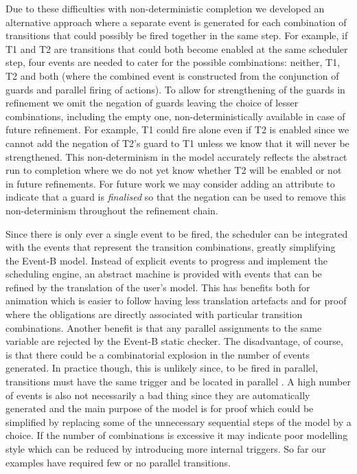Due to these difficulties with non-deterministic completion we developed an alternative approach where a separate event is generated for each combination of transitions that could possibly be fired together in the same step. 
For example, if T1 and T2 are transitions that could both become enabled at the same scheduler step, four events are needed to cater for the possible combinations: neither, T1, T2 and both (where the combined event is constructed from the conjunction of guards and parallel firing of actions). 
To allow for strengthening of the guards  in refinement we omit the negation of guards
leaving the choice of lesser combinations, including the empty one, non-deterministically available in case of future refinement.
For example, T1 could fire alone even if T2 is enabled since we cannot add the negation of T2's guard to T1 unless we know that it will never be strengthened. 
This non-determinism in the model accurately reflects the abstract run to completion where we do not yet know whether T2 will be enabled or not in future refinements. 
For future work we may consider adding an attribute to indicate that a guard is \emph{finalised} so that the negation can be used to remove this non-determinism throughout the refinement chain.

Since there is only ever a single event to be fired, the scheduler can be integrated with the events that represent the transition combinations, greatly simplifying the Event-B model.
Instead of explicit events to progress and implement the scheduling engine, an abstract machine is provided with events that can be refined by the translation of the user's \SCXML model.
This has benefits both for animation which is easier to follow having less translation artefacts and for proof where the obligations are directly associated with particular transition combinations. 
Another benefit is that any parallel assignments to the same variable are rejected by the Event-B static checker.
The disadvantage, of course, is that there could be a combinatorial explosion in the number of events generated.
In practice though, this is unlikely since, to be fired in parallel, transitions must have the same trigger and be located in parallel \statecharts.
A high number of events is also not necessarily a bad thing since they are automatically generated and the main purpose of the \EventB model is for proof which could be simplified by replacing some of the unnecessary sequential steps of the model by a choice.
If the number of combinations is excessive it may indicate poor modelling style which can be reduced by introducing more internal triggers.
So far our examples have required few or no parallel transitions.

